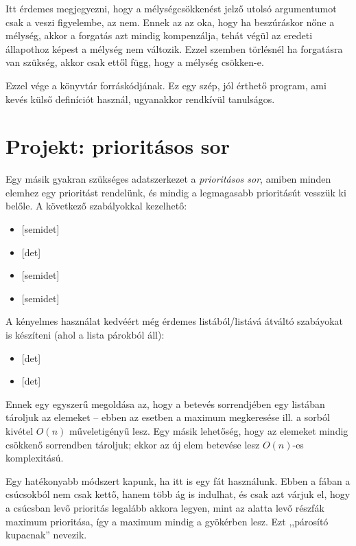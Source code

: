 Itt érdemes megjegyezni, hogy a mélységcsökkenést
jelző utolsó argumentumot csak a 
veszi figyelembe, az  nem. Ennek az az
oka, hogy ha beszúráskor nőne a mélység, akkor a
forgatás azt mindig kompenzálja, tehát végül az
eredeti állapothoz képest a mélység nem
változik. Ezzel szemben törlésnél ha forgatásra van
szükség, akkor csak ettől függ, hogy a mélység
csökken-e.

Ezzel vége a könyvtár forráskódjának. Ez egy szép,
jól érthető program, ami kevés külső definíciót
használ, ugyanakkor rendkívül tanulságos.

\section{Projekt: prioritásos sor}
Egy másik gyakran szükséges adatszerkezet a
\emph{prioritásos sor}, amiben minden elemhez egy
prioritást rendelünk, és mindig a legmagasabb
prioritásút vesszük ki belőle. A következő
szabályokkal kezelhető:
\begin{itemize}
\item {} [semidet]
\item {} [det]
\item {} [semidet]
\item {} [semidet]
\end{itemize}
A kényelmes használat kedvéért még érdemes
listából/listává átváltó szabáyokat is készíteni
(ahol a lista  párokból áll):
\begin{itemize}
\item {} [det]
\item {} [det]
\end{itemize}
Ennek egy egyszerű megoldása az, hogy a betevés
sorrendjében egy listában tároljuk az elemeket --
ebben az esetben a maximum megkeresése ill. a sorból
kivétel $O(n)$ műveletigényű lesz. Egy másik
lehetőség, hogy az elemeket mindig csökkenő
sorrendben tároljuk; ekkor az új elem betevése lesz
$O(n)$-es komplexitású.

Egy hatékonyabb módszert kapunk, ha itt is egy fát
használunk. Ebben a fában a csúcsokból nem csak
kettő, hanem több ág is indulhat, és csak azt várjuk
el, hogy a csúcsban levő prioritás legalább akkora
legyen, mint az alatta levő részfák maximum
prioritása, így a maximum mindig a gyökérben
lesz. Ezt ,,párosító kupacnak'' nevezik.

